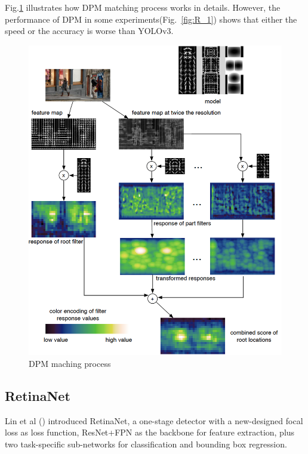 \documentclass[letterpaper]{article} %
\begin{document}
\noindent Fig.\ref{fig:DPM_2} illustrates how DPM matching process works in details. However, the performance of DPM in some experiments(Fig.~\ref{fig:R_1}) shows that either the speed or the accuracy is worse than YOLOv3.\\
\begin{figure}[ht]
\hspace{-14mm}
\centering
\includegraphics[width=0.85\linewidth,height = 1.0\linewidth]{Figure/DPM_2.png}
\caption{\footnotesize{DPM maching process}}
\label{fig:DPM_2}
\vspace{-3mm}
\end{figure}

\subsection{RetinaNet}
Lin et al (\citeyear{retinaNet}) introduced RetinaNet, a one-stage detector with a new-designed focal loss as loss function, ResNet+FPN as the backbone for feature extraction, plus two task-specific sub-networks for classification and bounding box regression.\\
\end{document}
